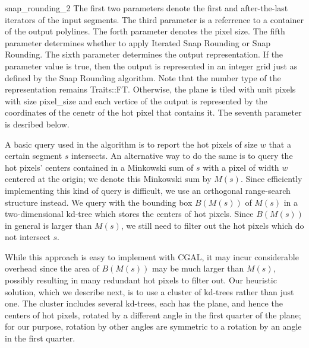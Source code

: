 \begin{ccRefFunction}{snap_rounding_2}
The first two parameters denote the first and after-the-last iterators of the input segments.
The third parameter is a referrence to a container of the output polylines.
The forth parameter denotes the pixel size. The fifth parameter determines whether to apply Iterated Snap Rounding
or Snap Rounding. The sixth parameter determines the output representation. If the
parameter value is {\ccc true}, then the output is represented in an integer
grid just as defined by the Snap Rounding algorithm. Note that the number type of
the representation remains {\ccc Traits::FT}. Otherwise, the plane is tiled
with unit pixels with size {\ccc pixel\_size} and each vertice of the output is
represented by the coordinates of the cenetr of the hot pixel that contains it.
The seventh parameter is desribed below.



\begin{ccAdvanced}

 A basic query used in the algorithm is to report the hot pixels of
 size $w$ that a certain segment $s$ intersects.  An alternative way to
 do the same is to query the hot pixels' centers contained in a
 Minkowski sum of $s$ with a pixel of width $w$ centered at the origin;
 we denote this Minkowski sum by $M(s)$. Since efficiently implementing
 this kind of query is difficult, we use an orthogonal range-search
 structure instead. We query with the bounding box $B(M(s))$ of $M(s)$
 in a two-dimensional kd-tree which stores the centers of hot
 pixels. Since $B(M(s))$ in general is larger than $M(s)$, we still
 need to filter out the hot pixels which do not intersect $s$.

 While this approach is easy to implement with CGAL, it may incur
 considerable overhead since the area of $B(M(s))$ may be much larger
 than $M(s)$, possibly resulting in many redundant hot pixels to filter
 out. Our heuristic solution, which we describe next, is to use a
 cluster of kd-trees rather than just one.  The cluster includes
 several kd-trees, each has the plane, and hence the centers of hot
 pixels, rotated by a different angle in the first quarter of the
 plane; for our purpose, rotation by other angles are symmetric to a
 rotation by an angle in the first quarter.


\end{ccAdvanced}
\end{ccRefFunction}
